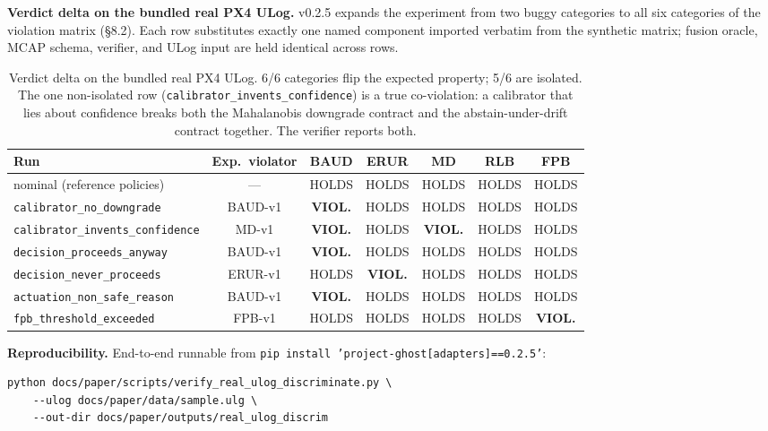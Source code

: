 \documentclass[acmsmall,nonacm=true,review=false]{acmart}
\theoremstyle{plain}
\begin{document}
\textbf{Verdict delta on the bundled real PX4 ULog.} v0.2.5
expands the experiment from two buggy categories to all six
categories of the violation matrix (\S8.2). Each row substitutes
exactly one named component imported verbatim from the synthetic
matrix; fusion oracle, MCAP schema, verifier, and ULog input are
held identical across rows.

\begin{table}[h]
\centering\small
\begin{tabular}{l c c c c c c}
\toprule
\textbf{Run} & \textbf{Exp.\ violator} & BAUD & ERUR & MD & RLB & FPB \\
\midrule
nominal (reference policies)              & ---     & HOLDS & HOLDS & HOLDS & HOLDS & HOLDS \\
\texttt{calibrator\_no\_downgrade}        & BAUD-v1 & \textbf{VIOL.} & HOLDS & HOLDS & HOLDS & HOLDS \\
\texttt{calibrator\_invents\_confidence}  & MD-v1   & \textbf{VIOL.} & HOLDS & \textbf{VIOL.} & HOLDS & HOLDS \\
\texttt{decision\_proceeds\_anyway}       & BAUD-v1 & \textbf{VIOL.} & HOLDS & HOLDS & HOLDS & HOLDS \\
\texttt{decision\_never\_proceeds}        & ERUR-v1 & HOLDS & \textbf{VIOL.} & HOLDS & HOLDS & HOLDS \\
\texttt{actuation\_non\_safe\_reason}     & BAUD-v1 & \textbf{VIOL.} & HOLDS & HOLDS & HOLDS & HOLDS \\
\texttt{fpb\_threshold\_exceeded}         & FPB-v1  & HOLDS & HOLDS & HOLDS & HOLDS & \textbf{VIOL.} \\
\bottomrule
\end{tabular}
\caption{Verdict delta on the bundled real PX4 ULog. 6/6 categories
flip the expected property; 5/6 are isolated. The one non-isolated
row (\texttt{calibrator\_invents\_confidence}) is a true
co-violation: a calibrator that lies about confidence breaks both
the Mahalanobis downgrade contract and the abstain-under-drift
contract together. The verifier reports both.}
\label{tab:realflight-discrim}
\end{table}

\textbf{Reproducibility.} End-to-end runnable from
\texttt{pip install 'project-ghost[adapters]==0.2.5'}:

\begin{lstlisting}
python docs/paper/scripts/verify_real_ulog_discriminate.py \
    --ulog docs/paper/data/sample.ulg \
    --out-dir docs/paper/outputs/real_ulog_discrim
\end{lstlisting}
\end{document}

